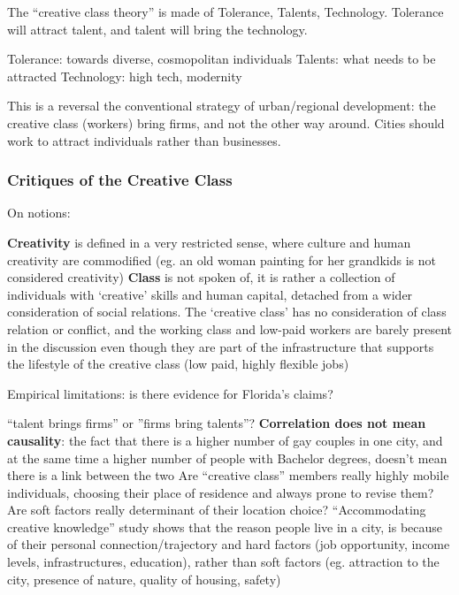 \documentclass{article}
\begin{document}
The ``creative class theory'' is made of Tolerance, Talents, Technology. Tolerance will attract talent, and talent will bring the technology. 

\begin{outline}
	\1 Tolerance: towards diverse, cosmopolitan individuals
	\1 Talents: what needs to be attracted
	\1 Technology: high tech, modernity
\end{outline}

This is a reversal the conventional strategy of urban/regional development: the creative class (workers) bring firms, and not the other way around. Cities should work to attract individuals rather than businesses.

\subsubsection{Critiques of the Creative Class}

On notions:

\begin{outline}
	\1 \textbf{Creativity} is defined in a very restricted sense, where culture and human creativity are commodified (eg. an old woman painting for her grandkids is not considered creativity)
	\1 \textbf{Class} is not spoken of, it is rather a collection of individuals with `creative' skills and human capital, detached from a wider consideration of social relations. The `creative class' has no consideration of class relation or conflict, and the working class and low-paid workers are barely present in the discussion even though they are part of the infrastructure that supports the lifestyle of the creative class (low paid, highly flexible jobs)
\end{outline}

Empirical limitations: is there evidence for Florida's claims?

\begin{outline}
	\1 ``talent brings firms'' or ''firms bring talents''?
		\2 \textbf{Correlation does not mean causality}: the fact that there is a higher number of gay couples in one city, and at the same time a higher number of people with Bachelor degrees, doesn't mean there is a link between the two
	\1 Are ``creative class'' members really highly mobile individuals, choosing their place of residence and always prone to revise them?	
	\1 Are soft factors really determinant of their location choice?
		\2 ``Accommodating creative knowledge'' study shows that the reason people live in a city, is because of their personal connection/trajectory and hard factors (job opportunity, income levels, infrastructures, education), rather than soft factors (eg. attraction to the city, presence of nature, quality of housing, safety)
\end{outline}
\end{document}

